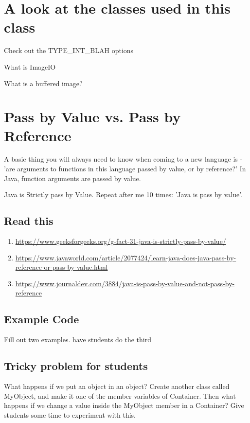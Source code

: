 \documentclass[12pt]{article}
\begin{document}
\section{A look at the classes used in this class}

Check out the TYPE\_INT\_BLAH options

What is ImageIO

What is a buffered image?

\section{Pass by Value vs. Pass by Reference}
A basic thing you will always need to know when coming to a new language is - 'are arguments to functions in this language passed by value, or by reference?' In Java, function arguments are passed by value.

Java is Strictly pass by Value. Repeat after me 10 times: 'Java is pass by value'.

\subsection{Read this}
\begin{enumerate}
\item \url{https://www.geeksforgeeks.org/g-fact-31-java-is-strictly-pass-by-value/}
\item \url{https://www.javaworld.com/article/2077424/learn-java-does-java-pass-by-reference-or-pass-by-value.html}
\item \url{https://www.journaldev.com/3884/java-is-pass-by-value-and-not-pass-by-reference}
\end{enumerate}

\subsection{Example Code}

Fill out two examples. have students do the third



\subsection{Tricky problem for students}
What happens if we put an object in an object? Create another class called MyObject, and make it one of the member variables of Container. Then what happens if we change a value inside the MyObject member in a Container? Give students some time to experiment with this.
\end{document}
